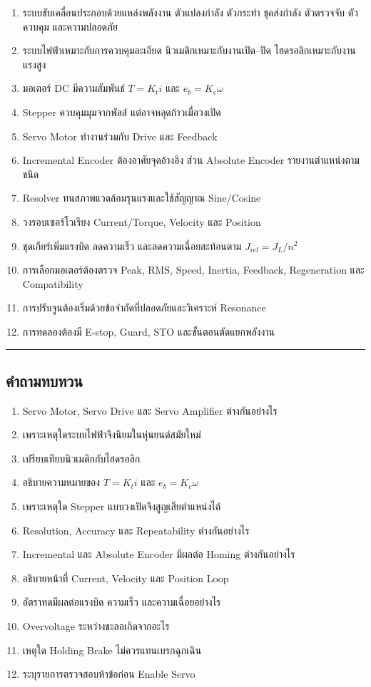 \begin{enumerate}
    \item ระบบขับเคลื่อนประกอบด้วยแหล่งพลังงาน ตัวแปลงกำลัง ตัวกระทำ ชุดส่งกำลัง ตัวตรวจจับ ตัวควบคุม และความปลอดภัย
    \item ระบบไฟฟ้าเหมาะกับการควบคุมละเอียด นิวเมติกเหมาะกับงานเปิด–ปิด ไฮดรอลิกเหมาะกับงานแรงสูง
    \item มอเตอร์ DC มีความสัมพันธ์ $T=K_ti$ และ $e_b=K_e\omega$
    \item Stepper ควบคุมมุมจากพัลส์ แต่อาจหลุดก้าวเมื่อวงเปิด
    \item Servo Motor ทำงานร่วมกับ Drive และ Feedback
    \item Incremental Encoder ต้องอาศัยจุดอ้างอิง ส่วน Absolute Encoder รายงานตำแหน่งตามชนิด
    \item Resolver ทนสภาพแวดล้อมรุนแรงและใช้สัญญาณ Sine/Cosine
    \item วงรอบเซอร์โวเรียง Current/Torque, Velocity และ Position
    \item ชุดเกียร์เพิ่มแรงบิด ลดความเร็ว และลดความเฉื่อยสะท้อนตาม $J_{\text{ref}}=J_L/n^2$
    \item การเลือกมอเตอร์ต้องตรวจ Peak, RMS, Speed, Inertia, Feedback, Regeneration และ Compatibility
    \item การปรับจูนต้องเริ่มด้วยข้อจำกัดที่ปลอดภัยและวิเคราะห์ Resonance
    \item การทดลองต้องมี E-stop, Guard, STO และขั้นตอนตัดแยกพลังงาน
\end{enumerate}

\par\noindent\rule{\textwidth}{0.4pt}\par

\newpage

\subsection{คำถามทบทวน}

\begin{enumerate}
    \item Servo Motor, Servo Drive และ Servo Amplifier ต่างกันอย่างไร
    \item เพราะเหตุใดระบบไฟฟ้าจึงนิยมในหุ่นยนต์สมัยใหม่
    \item เปรียบเทียบนิวเมติกกับไฮดรอลิก
    \item อธิบายความหมายของ $T=K_ti$ และ $e_b=K_e\omega$
    \item เพราะเหตุใด Stepper แบบวงเปิดจึงสูญเสียตำแหน่งได้
    \item Resolution, Accuracy และ Repeatability ต่างกันอย่างไร
    \item Incremental และ Absolute Encoder มีผลต่อ Homing ต่างกันอย่างไร
    \item อธิบายหน้าที่ Current, Velocity และ Position Loop
    \item อัตราทดมีผลต่อแรงบิด ความเร็ว และความเฉื่อยอย่างไร
    \item Overvoltage ระหว่างชะลอเกิดจากอะไร
    \item เหตุใด Holding Brake ไม่ควรแทนเบรกฉุกเฉิน
    \item ระบุรายการตรวจสอบห้าข้อก่อน Enable Servo
\end{enumerate}

